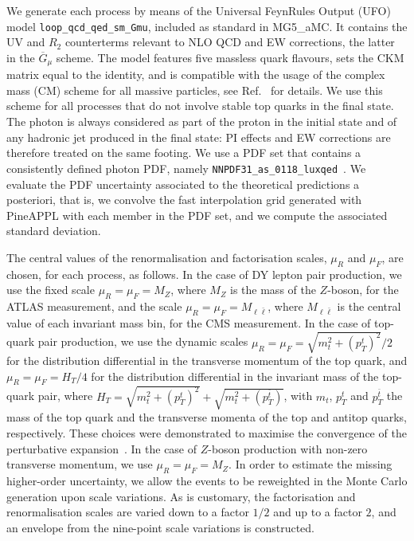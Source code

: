 We generate each process by means of the Universal FeynRules Output
(UFO)~\cite{Degrande:2011ua} model {\tt loop\_qcd\_qed\_sm\_Gmu},
included as standard in {\sc MG5\_aMC}. It contains the UV and $R_2$
counterterms relevant to NLO QCD and EW corrections, the latter in the
$\overline{G}_\mu$ scheme. The model features five massless quark flavours,
sets the CKM matrix equal to the identity, and is compatible with the usage of
the complex mass (CM) scheme for all massive particles, see
Ref.~\cite{Frederix:2018nkq} for details. We use this scheme
for all processes that do not involve stable top quarks in the final state.
The photon is always considered as part of the proton in the initial state and
of any hadronic jet produced in the final state: PI effects and EW corrections
are therefore treated on the same footing. We use a PDF set that contains a
consistently defined photon PDF, namely
{\tt NNPDF31\_as\_0118\_luxqed}~\cite{Bertone:2017bme}. We evaluate the PDF
uncertainty associated to the theoretical predictions a posteriori, that is,
we convolve the fast interpolation grid generated with {\sc PineAPPL} with
each member in the PDF set, and we compute the associated standard deviation.

The central values of the renormalisation and factorisation scales, $\mu_R$ and
$\mu_F$, are chosen, for each process, as follows. In the case of DY lepton pair
production, we use the fixed scale $\mu_R=\mu_F=M_Z$, where $M_Z$ is the mass
of the $Z$-boson, for the ATLAS measurement, and the scale
$\mu_R=\mu_F=M_{\ell\bar\ell}$, where $M_{\ell\bar\ell}$ is the central value of each
invariant mass bin, for the CMS measurement.
In the case of top-quark pair production, we use the dynamic scales
$\mu_R=\mu_F=\sqrt{m_t^2+(p_T^t)^2}{\Big /}2$ for the distribution differential
in the transverse momentum of the top quark, and $\mu_R=\mu_F=H_T/4$ for the
distribution differential in the invariant mass of the top-quark pair, where
$H_T=\sqrt{m_t^2+(p_T^t)^2}+\sqrt{m_t^2+(p_T^{\bar{t}})}$, with $m_t$,
$p_T^t$ and $p_T^{\bar t}$ the mass of the top quark and the transverse momenta
of the top and antitop quarks, respectively. These choices were demonstrated
to maximise the convergence of the perturbative expansion~\cite{Czakon:2016dgf}.
In the case of $Z$-boson production with non-zero transverse momentum, we use
$\mu_R=\mu_F=M_Z$. In order to estimate the missing higher-order uncertainty,
we allow the events to be reweighted in the Monte Carlo generation upon scale
variations. As is customary, the factorisation and renormalisation scales
are varied down to a factor $1/2$ and up to a factor $2$, and an envelope
from the nine-point scale variations is constructed.

